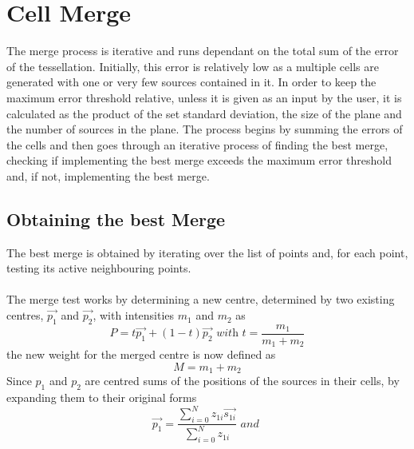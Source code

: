 \section{Cell Merge}

The merge process is iterative and runs dependant on the total sum of the error of the tessellation. Initially, this error is relatively low as a multiple cells are generated with one or very few sources contained in it. In order to keep the maximum error threshold relative, unless it is given as an input by the user, it is calculated as the product of the set standard deviation, the size of the plane and the number of sources in the plane. The process begins by summing the errors of the cells and then goes through an iterative process of finding the best merge, checking if implementing the best merge exceeds the maximum error threshold and, if not, implementing the best merge.

\subsection{Obtaining the best Merge}
The best merge is obtained by iterating over the list of points and, for each point, testing its active neighbouring points.
\\
\\
The merge test works by determining a new centre, determined by two existing centres, $\vec{p_1}$ and $\vec{p_2}$, with intensities $m_1$ and $m_2$ as
\begin{equation}
	P = t\vec{p_1} + (1-t)\vec{p_2} \textit{ with } t = \frac{m_1}{m_1 + m_2}
\end{equation}
the new weight for the merged centre is now defined as
\begin{equation}
	M = m_1 + m_2
\end{equation}
Since $p_1$ and $p_2$ are centred sums of the positions of the sources in their cells, by expanding them to their original forms
\begin{equation}
\vec{p_1} = \frac{\sum^N_{i=0} z_{1i}\vec{s_{1i}}}{\sum^N_{i=0}z_{1i}} \textit{ and }
\end{equation}